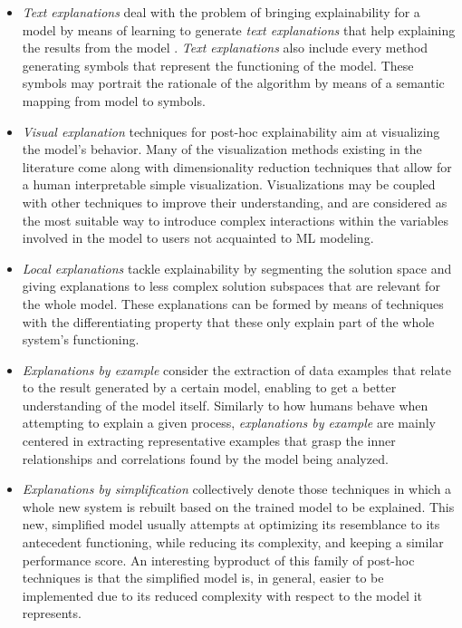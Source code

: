 \documentclass[final]{elsarticle}
\begin{document}
\begin{itemize}[leftmargin=*]
\item \textit{Text explanations} deal with the problem of bringing explainability for a model by means of learning to generate \textit{text explanations} that help explaining the results from the model \cite{Bennetot19}. \textit{Text explanations} also include every method generating symbols that represent the functioning of the model. These symbols may portrait the rationale of the algorithm by means of a semantic mapping from model to symbols.

\item \textit{Visual explanation} techniques for post-hoc explainability aim at visualizing the model's behavior. Many of the visualization methods existing in the literature come along with dimensionality reduction techniques that allow for a human interpretable simple visualization. Visualizations may be coupled with other techniques to improve their understanding, and are considered as the most suitable way to introduce complex interactions within the variables involved in the model to users not acquainted to ML modeling.

\item \textit{Local explanations} tackle explainability by segmenting the solution space and giving explanations to less complex solution subspaces that are relevant for the whole model. These explanations can be formed by means of techniques with the differentiating property that these only explain part of the whole system's functioning. 
    
\item \textit{Explanations by example} consider the extraction of data examples that relate to the result generated by a certain model, enabling to get a better understanding of the model itself. Similarly to how humans behave when attempting to explain a given process, \textit{explanations by example} are mainly centered in extracting representative examples that grasp the inner relationships and correlations found by the model being analyzed.
    
\item \textit{Explanations by simplification} collectively denote those techniques in which a whole new system is rebuilt based on the trained model to be explained. This new, simplified model usually attempts at optimizing its resemblance to its antecedent functioning, while reducing its complexity, and keeping a similar performance score. An interesting byproduct of this family of post-hoc techniques is that the simplified model is, in general, easier to be implemented due to its reduced complexity with respect to the model it represents.
    

\end{itemize}
\end{document}
